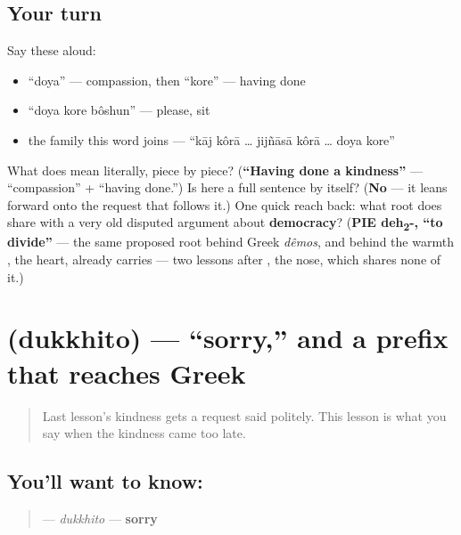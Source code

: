 \subsection*{Your turn}
Say these aloud:

\begin{itemize}
\raggedright
  \item \textquotedblleft{}doya\textquotedblright{} — compassion, then \textquotedblleft{}kore\textquotedblright{} — having done
  \item \textquotedblleft{}doya kore bôshun\textquotedblright{} — please, sit
  \item the family this word joins — \textquotedblleft{}kāj kôrā … jijñāsā kôrā … doya kore\textquotedblright{}
\end{itemize}

\begin{tcolorbox}[breakable,colback=teal!4,colframe=teal!35!black,title={Before you move on}]
What does   mean literally, piece by piece? (\textbf{\textquotedblleft{}Having done a kindness\textquotedblright{}} —  \textquotedblleft{}compassion\textquotedblright{} +  \textquotedblleft{}having done.\textquotedblright{}) Is  here a full sentence by itself? (\textbf{No} — it leans forward onto the request that follows it.) One quick reach back: what root does  share with a very old disputed argument about \textbf{democracy}? (\textbf{PIE deh\textsubscript{2}-, \textquotedblleft{}to divide\textquotedblright{}} — the same proposed root behind Greek \emph{dêmos}, and behind the warmth \textbf{}, the heart, already carries — two lessons after , the nose, which shares none of it.)
\end{tcolorbox}
\section[dukkhito]{ (dukkhito) — \textquotedblleft{}sorry,\textquotedblright{} and a prefix that reaches Greek}

\label{lesson:BN-C13-dukkhito}



\begin{quote}
Last lesson's kindness gets a request said politely. This lesson is what you say when the kindness came too late.
\end{quote}

\subsection*{You'll want to know: }
\begin{quote}
\textbf{} — \emph{dukkhito} — \textbf{sorry}
\end{quote}

